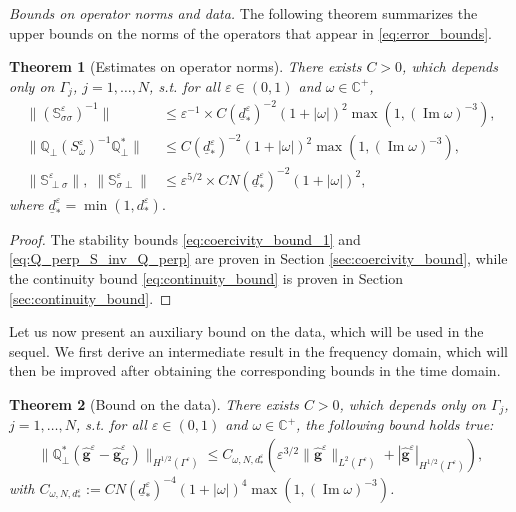 \documentclass[]{article}
\newtheorem{theorem}{Theorem}
\newtheorem{remark}{Remark}
\numberwithin{equation}{section}
\numberwithin{theorem}{section}
\numberwithin{lemma}{section}
\numberwithin{corollary}{section}
\numberwithin{proposition}{section}
\numberwithin{definition}{section}
\newcommand{\re}{\varepsilon}
\renewcommand{\vec}{\boldsymbol}
\begin{document}
	\textit{Bounds on operator norms and data. }
	The following theorem summarizes the upper bounds on the norms of the operators that appear in \eqref{eq:error_bounds}. 
	\begin{theorem}[Estimates on operator norms]
		\label{theorem:estimates_norms}
		There exists $C>0$, which depends only on $\Gamma_j$, $j=1,\ldots,N$, s.t. for all $\re \in (0,1)$ and $\omega \in \mathbb{C}^+$,
		\begin{align}
			\|(\mathbb{S}^{\re}_{\sigma \sigma})^{-1}\| &\leq \re^{-1}\times C (\underline{d}^{\re}_*)^{-2} (1+|\omega|)^2 \max(1, (\operatorname{Im}\omega)^{-3}), \label{eq:coercivity_bound_1} \\
			\|\mathbb{Q}_{\perp} (S^{\re}_{\omega})^{-1} \mathbb{Q}^*_{\perp} \| &\leq C(\underline{d}^{\re}_*)^{-2} (1+ |\omega|)^2 \max(1, (\operatorname{Im}\omega)^{-3} ) , \label{eq:Q_perp_S_inv_Q_perp}\\
			\label{eq:continuity_bound}
			\|\mathbb{S}^{\re}_{\perp\sigma}\|,\; \| \mathbb{S}^{\re}_{\sigma \perp} \| &\leq \re^{5/2}\times C N(\underline{d}^{\re}_*)^{-2} (1+|\omega|)^2, 
		\end{align}
		where $
		\underline{d}^{\re}_* = \min(1, d^{\re}_*).$
	\end{theorem}
	\begin{proof}
		The stability bounds \eqref{eq:coercivity_bound_1} and \eqref{eq:Q_perp_S_inv_Q_perp} are proven in Section \ref{sec:coercivity_bound}, while the continuity bound \eqref{eq:continuity_bound} is proven in Section \ref{sec:continuity_bound}.
	\end{proof}
	Let us now present an auxiliary bound on the data, which will be used in the sequel. We first derive an intermediate result in the frequency domain, which will then be improved after obtaining the corresponding bounds in the time domain.
	\begin{theorem}[Bound on the data]
		\label{theorem:bounds_data} 
		There exists $C>0$, which depends only on $\Gamma_j$, $j=1,\ldots,N$, s.t. for all $\re \in (0,1)$ and $\omega \in \mathbb{C}^+$, the following bound holds true:
		\begin{align*}%
			\|\mathbb{Q}^{*}_{\perp}( \hat{\vec{g}}^{\re}-\hat{\vec{g}}^{\re}_G)\|_{H^{1/2}(\Gamma^{\re})}  
			\leq C_{\omega, N, d^{\re}_*} (\re^{3/2} \| \hat{\vec{g}}^{\re} \|_{L^2(\Gamma^{\re})} + |\hat{\vec{g}}^{\re}|_{H^{1/2}(\Gamma^{\re})}),
		\end{align*}
		with  $	C_{\omega, N, d^{\re}_*} := C N (\underline{d}^{\re}_{*})^{-4} (1+|\omega|)^4 \max(1, (\operatorname{Im} \omega)^{-3})$.
	\end{theorem}
\end{document}
